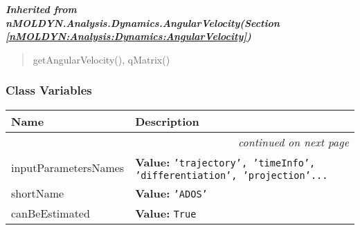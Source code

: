 \large{\textbf{\textit{Inherited from nMOLDYN.Analysis.Dynamics.AngularVelocity\textit{(Section \ref{nMOLDYN:Analysis:Dynamics:AngularVelocity})}}}}

\begin{quote}
getAngularVelocity(), qMatrix()
\end{quote}


  \subsubsection{Class Variables}

    \vspace{-1cm}
\hspace{\varindent}\begin{longtable}{|p{\varnamewidth}|p{\vardescrwidth}|l}
\cline{1-2}
\cline{1-2} \centering \textbf{Name} & \centering \textbf{Description}& \\
\cline{1-2}
\endhead\cline{1-2}\multicolumn{3}{r}{\small\textit{continued on next page}}\\\endfoot\cline{1-2}
\endlastfoot\raggedright i\-n\-p\-u\-t\-P\-a\-r\-a\-m\-e\-t\-e\-r\-s\-N\-a\-m\-e\-s\- & \raggedright \textbf{Value:} 
{\tt 'trajectory', 'timeInfo', 'differentiation', 'projection'\texttt{...}}&\\
\cline{1-2}
\raggedright s\-h\-o\-r\-t\-N\-a\-m\-e\- & \raggedright \textbf{Value:} 
{\tt 'ADOS'}&\\
\cline{1-2}
\raggedright c\-a\-n\-B\-e\-E\-s\-t\-i\-m\-a\-t\-e\-d\- & \raggedright \textbf{Value:} 
{\tt True}&\\
\cline{1-2}
\end{longtable}

